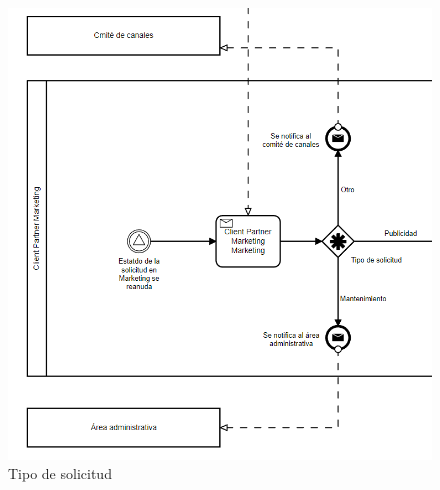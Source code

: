 \begin{figure}[H]
	\centering
	\includegraphics[scale=0.3]{Capitulo4/imagenes/3.png}
	\caption{Tipo de solicitud}
	\label{Tsol}
\end{figure}

